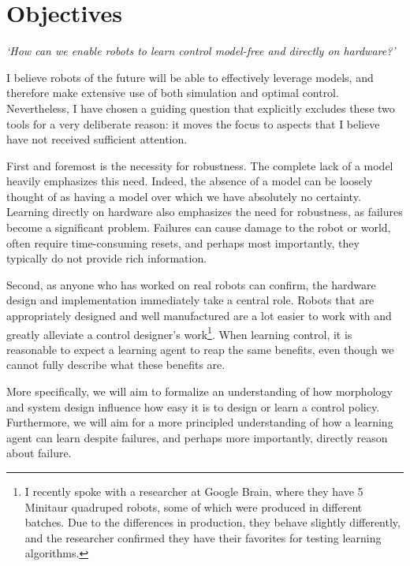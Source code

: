 \section{Objectives}
\emph{`How can we enable robots to learn control model-free and directly on hardware?'} \par
I believe robots of the future will be able to effectively leverage models, and therefore make extensive use of both simulation and optimal control.
Nevertheless, I have chosen a guiding question that explicitly excludes these two tools for a very deliberate reason: it moves the focus to aspects that I believe have not received sufficient attention. \par
First and foremost is the necessity for robustness. The complete lack of a model heavily emphasizes this need. Indeed, the absence of a model can be loosely thought of as having a model over which we have absolutely no certainty.
Learning directly on hardware also emphasizes the need for robustness, as failures become a significant problem. Failures can cause damage to the robot or world, often require time-consuming resets, and perhaps most importantly, they typically do not provide rich information. \par
Second, as anyone who has worked on real robots can confirm, the hardware design and implementation immediately take a central role. Robots that are appropriately designed and well manufactured are a lot easier to work with and greatly alleviate a control designer's work\footnote{I recently spoke with a researcher at Google Brain, where they have 5 Minitaur quadruped robots, some of which were produced in different batches. Due to the differences in production, they behave slightly differently, and the researcher confirmed they have their favorites for testing learning algorithms.}. When learning control, it is reasonable to expect a learning agent to reap the same benefits, even though we cannot fully describe what these benefits are. \par

More specifically, we will aim to formalize an understanding of how morphology and system design influence how easy it is to design or learn a control policy. Furthermore, we will aim for a more principled understanding of how a learning agent can learn despite failures, and perhaps more importantly, directly reason about failure.